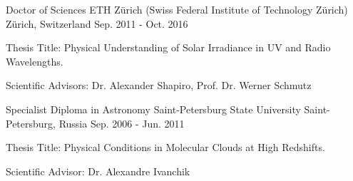 

\begin{cventries}

  \cventry
    {Doctor of Sciences} %
    {ETH Z{\"u}rich (Swiss Federal Institute of Technology Z{\"u}rich)} %
    {Z{\"u}rich, Switzerland} %
    {Sep. 2011 - Oct. 2016} %
    {
      \begin{cvitems} %
        \item {Thesis Title: Physical Understanding of Solar Irradiance in UV and Radio Wavelengths.}
        \item {Scientific Advisors: Dr. Alexander Shapiro, Prof. Dr. Werner Schmutz}
      \end{cvitems}
    }

  \cventry
    {Specialist Diploma in Astronomy} %
    {Saint-Petersburg State University} %
    {Saint-Petersburg, Russia} %
    {Sep. 2006 - Jun. 2011} %
    {
      \begin{cvitems} %
        \item {Thesis Title: Physical Conditions in Molecular Clouds at High Redshifts.}
        \item {Scientific Advisor: Dr. Alexandre Ivanchik}
      \end{cvitems}
    }

\end{cventries}
